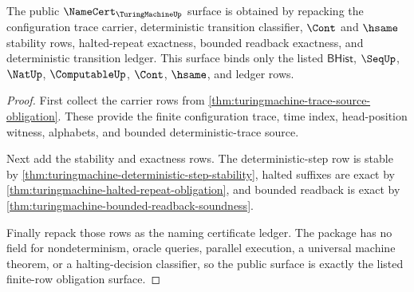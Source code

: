 \begin{theorem}
\label{thm:turingmachine-namecert-surface-obligation}
The public $\NameCert_{\TuringMachineUp}$ surface is obtained by repacking the
configuration trace carrier, deterministic transition classifier, $\Cont$ and
$\hsame$ stability rows, halted-repeat exactness, bounded readback exactness,
and deterministic transition ledger. This surface binds only the listed
$\mathsf{BHist}$, $\SeqUp$, $\NatUp$, $\ComputableUp$, $\Cont$, $\hsame$, and
ledger rows.
\end{theorem}
\begin{proof}
First collect the carrier rows from
\autoref{thm:turingmachine-trace-source-obligation}. These provide the finite
configuration trace, time index, head-position witness, alphabets, and bounded
deterministic-trace source.

Next add the stability and exactness rows. The deterministic-step row is stable
by \autoref{thm:turingmachine-deterministic-step-stability}, halted suffixes
are exact by \autoref{thm:turingmachine-halted-repeat-obligation}, and bounded
readback is exact by \autoref{thm:turingmachine-bounded-readback-soundness}.

Finally repack those rows as the naming certificate ledger. The package has no
field for nondeterminism, oracle queries, parallel execution, a universal
machine theorem, or a halting-decision classifier, so the public surface is
exactly the listed finite-row obligation surface.
\end{proof}


